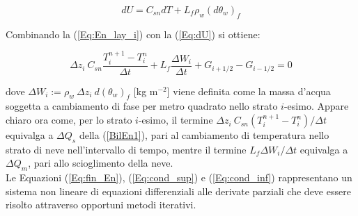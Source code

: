 \begin{equation}\label{Eq:dU}
dU=C_{sn} dT + L_f \rho_w (d\theta_w)_f
\end{equation}

\noindent Combinando la (\ref{Eq:En_lay_i}) con la (\ref{Eq:dU}) si ottiene:

\begin{equation}\label{Eq:fin_En}
\Delta z_i \ C_{sn} \frac{T_i^{n+1}-T_i^n}{\Delta t} + L_f \frac{\Delta W_i}{\Delta t} + G_{i+1/2}-G_{i-1/2}=0
\end{equation}

\noindent dove $\Delta W_i:=\rho_w \ \Delta z_i \ d(\theta_w)_f$ [kg m$^{-2}$] viene definita come la massa d'acqua soggetta a cambiamento di fase per metro quadrato nello strato $i$-esimo. 
Appare chiaro ora come, per lo strato $i$-esimo, il termine $\Delta z_i \ C_{sn}(T_i^{n+1}-T_i^n)/\Delta t$ equivalga a $\Delta Q_s$ della (\ref{BilEn1}), pari al cambiamento di temperatura nello strato di neve nell'intervallo di tempo, mentre il termine $L_f \Delta W_i / \Delta t$ equivalga a $\Delta Q_m$, pari allo scioglimento della neve.\\
Le Equazioni (\ref{Eq:fin_En}), (\ref{Eq:cond_sup}) e (\ref{Eq:cond_inf}) rappresentano un sistema non lineare di equazioni differenziali alle derivate parziali che deve essere risolto attraverso opportuni metodi iterativi.
